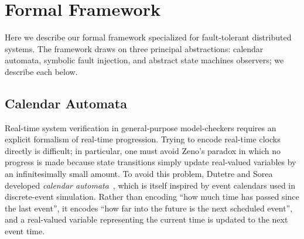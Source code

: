 \documentclass{llncs/llncs}
\begin{document}




\section{Formal Framework}\label{sec:model}
Here we describe our formal framework specialized for fault-tolerant distributed systems. The framework draws on three principal abstractions: calendar automata, symbolic fault injection, and abstract state machines observers; we describe each below.

\subsection{Calendar Automata}\label{sec:calendar}

Real-time system verification in general-purpose model-checkers requires an explicit formalism of real-time progression. Trying to encode real-time clocks directly is difficult; in particular, one must avoid Zeno's paradox in which no progress is made because state transitions simply update real-valued variables by an infinitesimally small amount. To avoid this problem, Dutetre and Sorea developed \emph{calendar automata}~\cite{cal}, which is itself inspired by event calendars used in discrete-event simulation. Rather than encoding ``how much time has passed since the last event'', it encodes ``how far into the future is the next scheduled event'', and a real-valued variable representing the current time is updated to the next event time.
\end{document}
